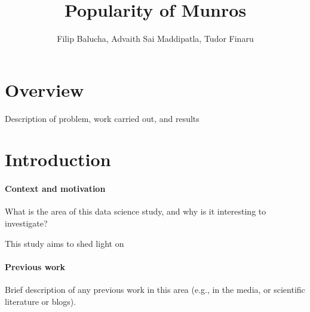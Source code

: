 \documentclass[11pt,a4paper]{article}
\title{Popularity of Munros}
\author{Filip Balucha, Advaith Sai Maddipatla, Tudor Finaru}
\begin{document}
\maketitle


\section{Overview}
Description of problem, work carried out, and results

\section{Introduction}

\paragraph{Context and motivation}

What is the area of this data science study, and why is it interesting
to investigate?

\medskip 

This study aims to shed light on 

\paragraph{Previous work}

Brief description of any previous work in this area (e.g., in the
media, or scientific literature or blogs).
\end{document}
